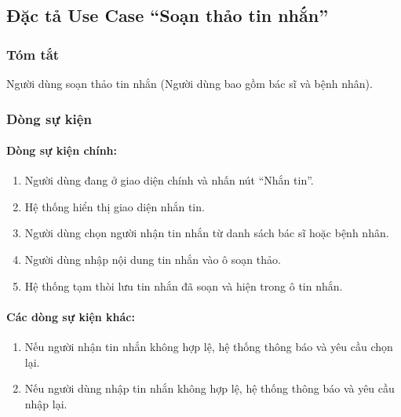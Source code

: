 \subsection{Đặc tả Use Case ``Soạn thảo tin nhắn''}

\subsubsection{Tóm tắt}
Người dùng soạn thảo tin nhắn (Người dùng bao gồm bác sĩ và bệnh nhân).

\subsubsection{Dòng sự kiện}
\paragraph{\textbf{Dòng sự kiện chính:}}
\begin{enumerate}
    \item Người dùng đang ở giao diện chính và nhấn nút ``Nhắn tin''.
    \item Hệ thống hiển thị giao diện nhắn tin.
    \item Người dùng chọn người nhận tin nhắn từ danh sách bác sĩ hoặc bệnh nhân.
    \item Người dùng nhập nội dung tin nhắn vào ô soạn thảo.
    \item Hệ thống tạm thòi lưu tin nhắn đã soạn và hiện trong ô tin nhắn.
\end{enumerate}

\paragraph{\textbf{Các dòng sự kiện khác:}}
\begin{enumerate}
    \item Nếu người nhận tin nhắn không hợp lệ, hệ thống thông báo và yêu cầu chọn lại.
    \item Nếu người dùng nhập tin nhắn không hợp lệ, hệ thống thông báo và yêu cầu nhập lại.
\end{enumerate}


